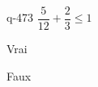 \begin{truefalse}{q-473}
$\dfrac{5}{12} + \dfrac{2}{3} \leq 1$
\item Vrai
\item* Faux
\end{truefalse}


